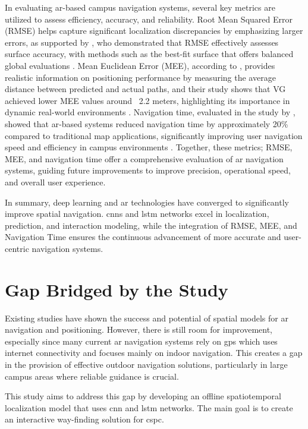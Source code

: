 \begin{refsection}
In evaluating \gls{ar}-based campus navigation systems, several key metrics are utilized to assess efficiency, accuracy, and reliability. Root Mean Squared Error (RMSE) helps capture significant localization discrepancies by emphasizing larger errors, as supported by \citeauthor{thirtysix} \citeyear{thirtysix}, who demonstrated that RMSE effectively assesses surface accuracy, with methods such as the best-fit surface that offers balanced global evaluations \cite{thirtysix}. Mean Euclidean Error (MEE), according to \citeauthor{thirtyseven} \citeyear{thirtyseven}, provides realistic information on positioning performance by measuring the average distance between predicted and actual paths, and their study shows that VG achieved lower MEE values around ~2.2 meters, highlighting its importance in dynamic real-world environments \cite{thirtyseven}. Navigation time, evaluated in the study by \citeauthor{one} \citeyear{one}, showed that \gls{ar}-based systems reduced navigation time by approximately 20\% compared to traditional map applications, significantly improving user navigation speed and efficiency in campus environments \cite{one}. Together, these metrics; RMSE, MEE, and navigation time offer a comprehensive evaluation of \gls{ar} navigation systems, guiding future improvements to improve precision, operational speed, and overall user experience.

In summary, deep learning and \gls{ar} technologies have converged to significantly improve spatial navigation. \gls{cnn}s and \gls{lstm} networks excel in localization, prediction, and interaction modeling, while the integration of RMSE, MEE, and Navigation Time ensures the continuous advancement of more accurate and user-centric navigation systems.

\section{Gap Bridged by the Study}

Existing studies have shown the success and potential of spatial models for \gls{ar} navigation and positioning. However, there is still room for improvement, especially since many current \gls{ar} navigation systems rely on \gls{gps} which uses internet connectivity and focuses mainly on indoor navigation. This creates a gap in the provision of effective outdoor navigation solutions, particularly in large campus areas where reliable guidance is crucial.

This study aims to address this gap by developing an offline spatiotemporal localization model that uses \gls{cnn} and \gls{lstm} networks. The main goal is to create an interactive way-finding solution for \gls{cspc}.

\clearpage

\printbibliography[heading=subbibintoc, title={\centering Notes}]
\end{refsection}